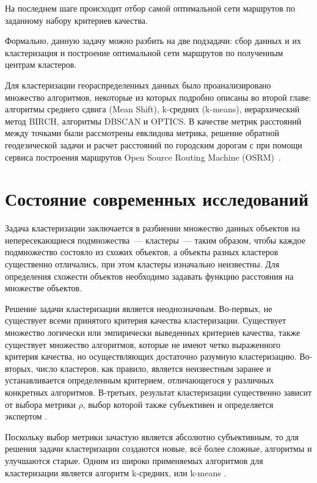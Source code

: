 На последнем шаге происходит отбор самой оптимальной сети маршрутов по заданному набору критериев качества.

Формально, данную задачу можно разбить на две подзадачи: сбор данных и их кластеризация и построение оптимальной сети маршрутов по полученным центрам кластеров.

Для кластеризации геораспределенных данных было проанализировано множество алгоритмов, некоторые из которых подробно описаны во второй главе: алгоритмы среднего сдвига (Mean Shift), k-средних (k-means), иерархический метод BIRCH, алгоритмы DBSCAN и OPTICS. В качестве метрик расстояний между точками были рассмотрены евклидова метрика, решение обратной геодезической задачи и расчет расстояний по городским дорогам с при помощи сервиса построения маршрутов Open Source Routing Machine (OSRM)~\cite{OSRM}.

\section{Состояние современных исследований} \label{sec:methods_}
Задача кластеризации заключается в разбиении множество данных объектов на непересекающиеся подмножества~--- кластеры~--- таким образом, чтобы каждое подмножество состояло из схожих объектов, а объекты разных кластеров существенно отличались, при этом кластеры изначально неизвестны. Для определения схожести объектов необходимо задавать функцию расстояния на множестве объектов.

Решение задачи кластеризации является неоднозначным. Во-первых, не существует всеми принятого критерия качества кластеризации. Существует множество логически или эмпирически выведенных критериев качества, также существует множество алгоритмов, которые не имеют четко выраженного критерия качества, но осуществляющих достаточно разумную кластеризацию. Во-вторых, число кластеров, как правило, является неизвестным заранее и устанавливается определенным критерием, отличающегося у различных конкретных алгоритмов. В-третьих, результат кластеризации существенно зависит от выбора метрики \( \rho \), выбор которой также субъективен и определяется экспертом \cite{voron, fraley}.

Поскольку выбор метрики зачастую является абсолютно субъективным, то для решения задачи кластеризации создаются новые, всё более сложные, алгоритмы и улучшаются старые. Одним из широко применяемых алгоритмов для кластеризации является алгоритм k-средних, или k-means \cite{elcan, kanungo, likas, hybrid, lenka, approxkm, krishna}.


